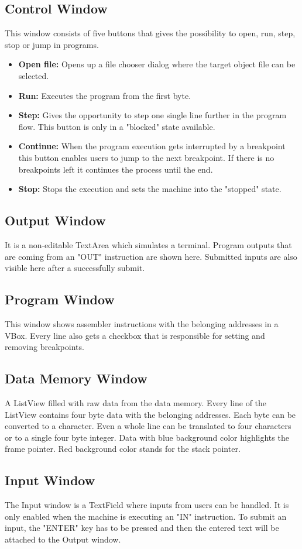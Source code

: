 \subsection{Control Window}
This window consists of five buttons that gives the possibility to open, run, step, stop or jump in programs. 
\begin{itemize}
\item \textbf{Open file: }Opens up a file chooser dialog where the target object file can be selected.
\item \textbf{Run: }Executes the program from the first byte.
\item \textbf{Step: }Gives the opportunity to step one single line further in the program flow. This button is only in a "blocked" state available.
\item \textbf{Continue: }When the program execution gets interrupted by a breakpoint this button enables users to jump to the next breakpoint. If there is no breakpoints left it continues the process until the end.
\item \textbf{Stop: }Stops the execution and sets the machine into the "stopped" state.
\end{itemize}
\subsection{Output Window}
It is a non-editable TextArea which simulates a terminal. Program outputs that are coming from an "OUT" instruction are shown here. Submitted inputs are also visible here after a successfully submit.
\subsection{Program Window}
This window shows assembler instructions with the belonging addresses in a VBox. Every line also gets a checkbox that is responsible for setting and removing breakpoints.
\subsection{Data Memory Window}
A ListView filled with raw data from the data memory. Every line of the ListView contains four byte data with the belonging addresses. Each byte can be converted to a character. Even a whole line can be translated to four characters or to a single four byte integer. Data with blue background color highlights the frame pointer. Red background color stands for the stack pointer.
\subsection{Input Window}
The Input window is a TextField where inputs from users can be handled. It is only enabled when the machine is executing an "IN" instruction. To submit an input, the "ENTER" key has to be pressed and then the entered text will be attached to the Output window.
